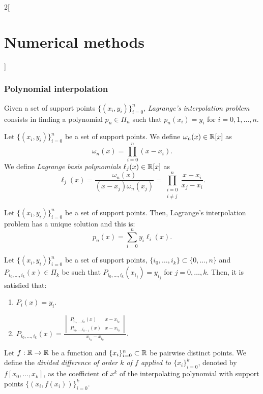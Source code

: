 \documentclass[../../../main.tex]{subfiles}
\begin{document}
\begin{multicols}{2}[\section{Numerical methods}]
\subsubsection*{Polynomial interpolation}
\begin{definition}
    Given a set of support points $\{(x_i,y_i)\}_{i=0}^n$, \textit{Lagrange's interpolation problem} consists in finding a polynomial $p_n\in\Pi_n$ such that $p_n(x_i)=y_i$ for $i=0,1,\ldots,n$.
\end{definition}
\begin{definition}
    Let $\{(x_i,y_i)\}_{i=0}^n$ be a set of support points. We define $\omega_n(x)\in\mathbb{R}[x]$ as $$\omega_n(x)=\prod_{i=0}^n(x-x_i).$$ We define \textit{Lagrange basis polynomials} $\ell_j(x)\in\mathbb{R}[x]$ as $$\ell_j(x)=\frac{\omega_n(x)}{(x-x_j)\omega_n(x_j)}=\prod_{\substack{i=0\\i\ne j}}^n\frac{x-x_i}{x_j-x_i}.$$
\end{definition}
\begin{prop}
    Let $\{(x_i,y_i)\}_{i=0}^n$ be a set of support points. Then, Lagrange's interpolation problem has a unique solution and this is: $$p_n(x)=\sum_{i=0}^ny_i\ell_i(x).$$
\end{prop}
\begin{method}
    Let $\{(x_i,y_i)\}_{i=0}^n$ be a set of support points, $\{i_0,\ldots,i_k\}\subset\{0,\ldots,n\}$ and $P_{i_0,\ldots,i_k}(x)\in\Pi_k$ be such that $P_{i_0,\ldots,i_k}(x_{i_j}) = y_{i_j}$ for $j=0,\ldots,k$. Then, it is satisfied that:
    \begin{enumerate}
        \item $P_i(x)=y_i$.
        \item $P_{i_0,\ldots,i_k}(x)=\frac{\begin{vmatrix}
        P_{i_1,\ldots,i_k}(x) & x-x_{i_k}\\
        P_{i_0,\ldots,i_{k-1}}(x) & x-x_{i_0}
        \end{vmatrix}}{x_{i_k}-x_{i_0}}$.
    \end{enumerate}
\end{method}
\begin{definition}
    Let $f:\mathbb{R}\rightarrow\mathbb{R}$ be a function and $\{x_i\}_{i=0}^n\subset\mathbb{R}$ be pairwise distinct points. We define the \textit{divided difference of order $k$ of $f$ applied to $\{x_i\}_{i=0}^k$}, denoted by $f[x_0,\ldots,x_k]$, as the coefficient of $x^k$ of the interpolating polynomial with support points $\{(x_i,f(x_i))\}_{i=0}^k$.
\end{definition}

\end{multicols}
\end{document}
